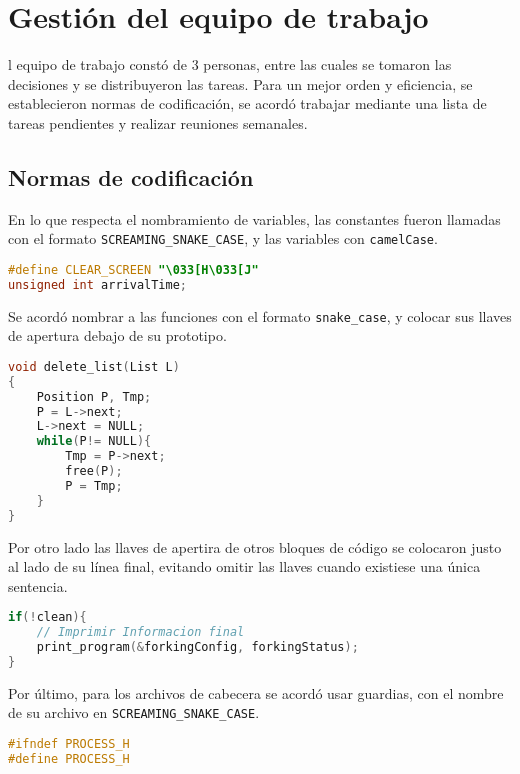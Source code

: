 \section{Gestión del equipo de trabajo}
l equipo de trabajo constó de 3 personas, entre las cuales se tomaron las decisiones y se distribuyeron las tareas. Para un mejor orden y eficiencia, se establecieron normas de codificación, se acordó trabajar mediante una lista de tareas pendientes y realizar reuniones semanales.

\subsection{Normas de codificación}
En lo que respecta el nombramiento de variables, las constantes fueron llamadas con el formato \verb|SCREAMING_SNAKE_CASE|, y las variables con \verb|camelCase|.


\begin{lstlisting}[language=C, caption=Ejemplo de Screaming Snake Case y camelCase]
#define CLEAR_SCREEN "\033[H\033[J"
unsigned int arrivalTime;
\end{lstlisting}

Se acordó nombrar a las funciones con el formato \verb|snake_case|, y colocar sus llaves de apertura debajo de su prototipo.

\begin{lstlisting}[language=C, caption=Ejemplo de Snake case]
void delete_list(List L)
{
    Position P, Tmp;
    P = L->next;
    L->next = NULL;
    while(P!= NULL){
        Tmp = P->next;
        free(P);
        P = Tmp;
    }
}
\end{lstlisting}

Por otro lado las llaves de apertira de otros bloques de código se colocaron justo al lado de su línea final, evitando omitir las llaves cuando existiese una única sentencia.

\begin{lstlisting}[language=C, caption=Ejemplo bloques de código]
if(!clean){
    // Imprimir Informacion final
    print_program(&forkingConfig, forkingStatus);
}
\end{lstlisting}

Por último, para los archivos de cabecera se acordó usar guardias, con el nombre de su archivo en \verb|SCREAMING_SNAKE_CASE|.

\begin{lstlisting}[language=C, caption=Ejemplo de Guardias en archivos de cabecera]
#ifndef PROCESS_H
#define PROCESS_H
\end{lstlisting}

